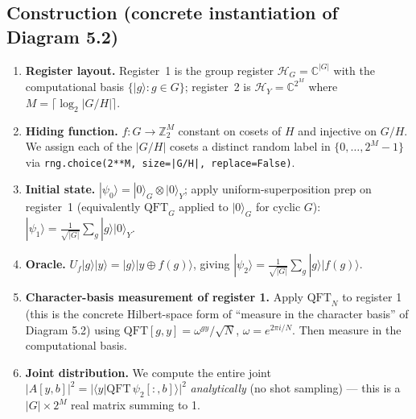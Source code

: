 \documentclass[11pt]{article}
\begin{document}
\subsection{Construction (concrete instantiation of Diagram 5.2)}
\begin{enumerate}
\item \textbf{Register layout.} Register~1 is the group register $\mathcal{H}_G = \mathbb{C}^{|G|}$
      with the computational basis $\{|g\rangle : g \in G\}$; register~2 is
      $\mathcal{H}_Y = \mathbb{C}^{2^M}$ where $M = \lceil \log_2 |G/H| \rceil$.
\item \textbf{Hiding function.} $f: G \to \mathbb{Z}_2^M$ constant on cosets of $H$ and injective
      on $G/H$. We assign each of the $|G/H|$ cosets a distinct random label in $\{0,\ldots,2^M-1\}$
      via \texttt{rng.choice(2**M, size=|G/H|, replace=False)}.
\item \textbf{Initial state.} $|\psi_0\rangle = |0\rangle_G \otimes |0\rangle_Y$;
      apply uniform-superposition prep on register~1 (equivalently $\mathrm{QFT}_G$ applied to $|0\rangle_G$
      for cyclic $G$):
      $|\psi_1\rangle = \tfrac{1}{\sqrt{|G|}} \sum_g |g\rangle |0\rangle_Y$.
\item \textbf{Oracle.} $U_f |g\rangle |y\rangle = |g\rangle |y \oplus f(g)\rangle$, giving
      $|\psi_2\rangle = \tfrac{1}{\sqrt{|G|}} \sum_g |g\rangle |f(g)\rangle$.
\item \textbf{Character-basis measurement of register 1.} Apply $\mathrm{QFT}_N$ to register 1
      (this is the concrete Hilbert-space form of ``measure in the character basis'' of Diagram 5.2)
      using $\mathrm{QFT}[g,y] = \omega^{gy}/\sqrt N$, $\omega = e^{2\pi i / N}$. Then measure
      in the computational basis.
\item \textbf{Joint distribution.} We compute the entire joint $|A[y,b]|^2 = |\langle y | \mathrm{QFT}\, \psi_2[:,b]\rangle|^2$
      \emph{analytically} (no shot sampling) --- this is a $|G| \times 2^M$ real matrix summing to 1.
\end{enumerate}
\end{document}
